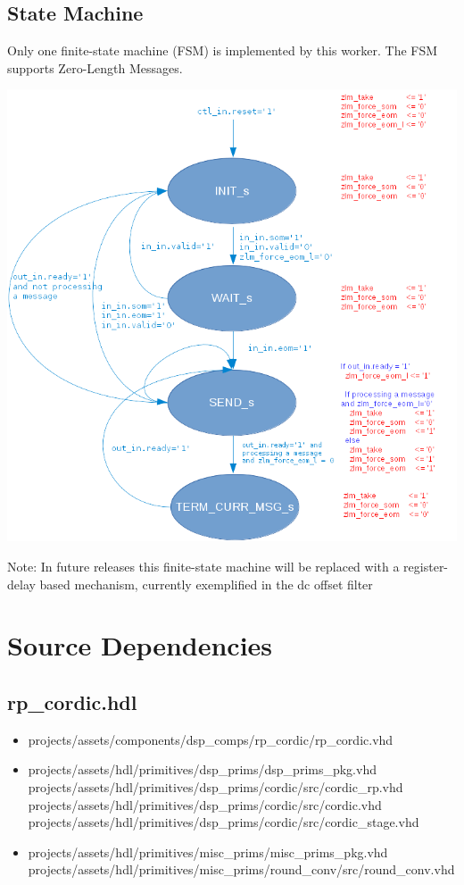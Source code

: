 \documentclass{article}
\def\comp{rp\_cordic}
\begin{document}
\subsection*{State Machine}
\begin{flushleft}
	Only one finite-state machine (FSM) is implemented by this worker. The FSM supports Zero-Length Messages.
\end{flushleft}
{\centering\captionsetup{type=figure}\includegraphics[scale=0.3]{rp_cordic_zlm_fsm}\par{}\label{fig:rp_cordic_zlm_fsm}}
\begin{flushleft}
        Note: In future releases this finite-state machine will be replaced with a register-delay based mechanism, currently exemplified in the dc offset filter
\end{flushleft}


\newpage

\section*{Source Dependencies}
\subsection*{\comp.hdl}
\begin{itemize}
	\item projects/assets/components/dsp\_comps/rp\_cordic/rp\_cordic.vhd
	\item projects/assets/hdl/primitives/dsp\_prims/dsp\_prims\_pkg.vhd
	      \subitem projects/assets/hdl/primitives/dsp\_prims/cordic/src/cordic\_rp.vhd
	      \subitem projects/assets/hdl/primitives/dsp\_prims/cordic/src/cordic.vhd
	      \subitem projects/assets/hdl/primitives/dsp\_prims/cordic/src/cordic\_stage.vhd
	\item projects/assets/hdl/primitives/misc\_prims/misc\_prims\_pkg.vhd
	      \subitem projects/assets/hdl/primitives/misc\_prims/round\_conv/src/round\_conv.vhd
\end{itemize}
\end{document}
